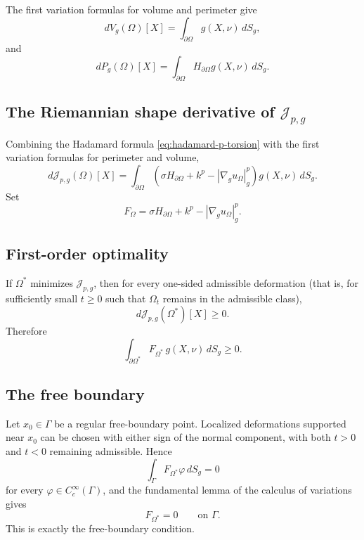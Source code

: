 \documentclass{article}
\renewcommand{\boxed}[1]{#1}
\begin{document}
The first variation formulas for volume and perimeter give
\[
dV_g(\Omega)[X]
=
\int_{\partial\Omega}g(X,\nu)\,dS_g,
\]
and
\[
dP_g(\Omega)[X]
=
\int_{\partial\Omega}
H_{\partial\Omega}g(X,\nu)\,dS_g.
\]

\subsection{The Riemannian shape derivative of $\mathcal J_{p,g}$}

Combining the Hadamard formula \eqref{eq:hadamard-p-torsion} with the first variation formulas for perimeter and volume,
\[
\boxed{
d\mathcal J_{p,g}(\Omega)[X]
=
\int_{\partial\Omega}
\left(
\sigma H_{\partial\Omega}
+k^p
-
|\nabla_g u_\Omega|_g^p
\right)
g(X,\nu)\,dS_g.
}
\]
Set
\[
F_\Omega
=
\sigma H_{\partial\Omega}
+k^p
-
|\nabla_g u_\Omega|_g^p.
\]

\subsection{First-order optimality}

If $\Omega^\ast$ minimizes $\mathcal J_{p,g}$, then for every
one-sided admissible deformation (that is, for sufficiently small
$t\geq0$ such that $\Omega_t$ remains in the admissible class),
\[
d\mathcal J_{p,g}(\Omega^\ast)[X]\geq0.
\]
Therefore
\[
\int_{\partial\Omega^\ast}
F_{\Omega^\ast}\,
g(X,\nu)\,dS_g
\geq0.
\]

\subsection{The free boundary}

Let $x_0\in\Gamma$ be a regular free-boundary point. Localized
deformations supported near $x_0$ can be chosen with either sign of
the normal component, with both $t>0$ and $t<0$ remaining admissible.
Hence
\[
\int_\Gamma
F_{\Omega^\ast}\varphi\,dS_g=0
\]
for every $\varphi\in C_c^\infty(\Gamma)$, and the fundamental lemma
of the calculus of variations gives
\[
F_{\Omega^\ast}=0
\qquad\text{on }\Gamma.
\]
This is exactly the free-boundary condition.
\end{document}
